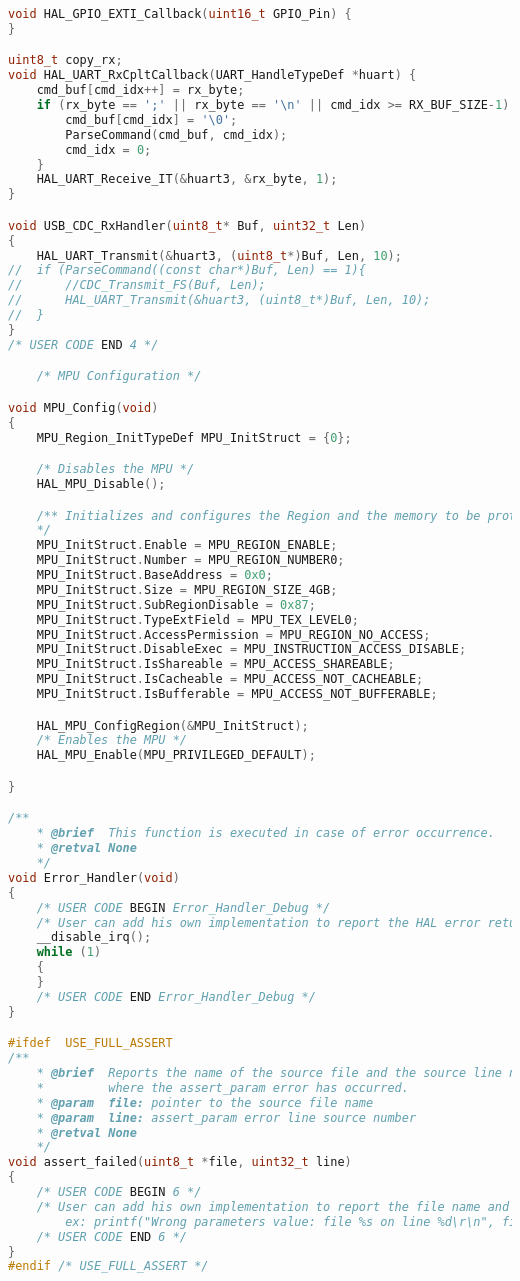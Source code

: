 \begin{lstlisting}[language=C++]
void HAL_GPIO_EXTI_Callback(uint16_t GPIO_Pin) {
}

uint8_t copy_rx;
void HAL_UART_RxCpltCallback(UART_HandleTypeDef *huart) {
    cmd_buf[cmd_idx++] = rx_byte;
    if (rx_byte == ';' || rx_byte == '\n' || cmd_idx >= RX_BUF_SIZE-1) {
        cmd_buf[cmd_idx] = '\0';
        ParseCommand(cmd_buf, cmd_idx);
        cmd_idx = 0;
    }
    HAL_UART_Receive_IT(&huart3, &rx_byte, 1);
}

void USB_CDC_RxHandler(uint8_t* Buf, uint32_t Len)
{
    HAL_UART_Transmit(&huart3, (uint8_t*)Buf, Len, 10);
//	if (ParseCommand((const char*)Buf, Len) == 1){
//		//CDC_Transmit_FS(Buf, Len);
//		HAL_UART_Transmit(&huart3, (uint8_t*)Buf, Len, 10);
//	}
}
/* USER CODE END 4 */

    /* MPU Configuration */

void MPU_Config(void)
{
    MPU_Region_InitTypeDef MPU_InitStruct = {0};

    /* Disables the MPU */
    HAL_MPU_Disable();

    /** Initializes and configures the Region and the memory to be protected
    */
    MPU_InitStruct.Enable = MPU_REGION_ENABLE;
    MPU_InitStruct.Number = MPU_REGION_NUMBER0;
    MPU_InitStruct.BaseAddress = 0x0;
    MPU_InitStruct.Size = MPU_REGION_SIZE_4GB;
    MPU_InitStruct.SubRegionDisable = 0x87;
    MPU_InitStruct.TypeExtField = MPU_TEX_LEVEL0;
    MPU_InitStruct.AccessPermission = MPU_REGION_NO_ACCESS;
    MPU_InitStruct.DisableExec = MPU_INSTRUCTION_ACCESS_DISABLE;
    MPU_InitStruct.IsShareable = MPU_ACCESS_SHAREABLE;
    MPU_InitStruct.IsCacheable = MPU_ACCESS_NOT_CACHEABLE;
    MPU_InitStruct.IsBufferable = MPU_ACCESS_NOT_BUFFERABLE;

    HAL_MPU_ConfigRegion(&MPU_InitStruct);
    /* Enables the MPU */
    HAL_MPU_Enable(MPU_PRIVILEGED_DEFAULT);

}

/**
    * @brief  This function is executed in case of error occurrence.
    * @retval None
    */
void Error_Handler(void)
{
    /* USER CODE BEGIN Error_Handler_Debug */
    /* User can add his own implementation to report the HAL error return state */
    __disable_irq();
    while (1)
    {
    }
    /* USER CODE END Error_Handler_Debug */
}

#ifdef  USE_FULL_ASSERT
/**
    * @brief  Reports the name of the source file and the source line number
    *         where the assert_param error has occurred.
    * @param  file: pointer to the source file name
    * @param  line: assert_param error line source number
    * @retval None
    */
void assert_failed(uint8_t *file, uint32_t line)
{
    /* USER CODE BEGIN 6 */
    /* User can add his own implementation to report the file name and line number,
        ex: printf("Wrong parameters value: file %s on line %d\r\n", file, line) */
    /* USER CODE END 6 */
}
#endif /* USE_FULL_ASSERT */
\end{lstlisting}


\endinput